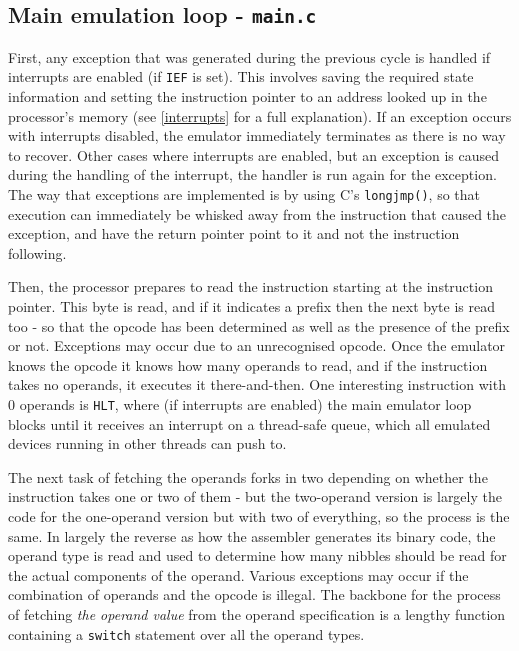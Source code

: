 \documentclass[12pt,a4paper]{report}
\begin{document}
\subsection*{Main emulation loop - \texttt{main.c}}

First, any exception that was generated during the previous cycle is handled if interrupts are enabled (if \texttt{IEF} is set). This involves saving the required state information and setting the instruction pointer to an address looked up in the processor's memory (see \autoref{interrupts} for a full explanation). If an exception occurs with interrupts disabled, the emulator immediately terminates as there is no way to recover. Other cases where interrupts are enabled, but an exception is caused during the handling of the interrupt, the handler is run again for the exception. The way that exceptions are implemented is by using C's \texttt{longjmp()}, so that execution can immediately be whisked away from the instruction that caused the exception, and have the return pointer point to it and not the instruction following.

Then, the processor prepares to read the instruction starting at the instruction pointer. This byte is read, and if it indicates a prefix then the next byte is read too - so that the opcode has been determined as well as the presence of the prefix or not. Exceptions may occur due to an unrecognised opcode. Once the emulator knows the opcode it knows how many operands to read, and if the instruction takes no operands, it executes it there-and-then. One interesting instruction with 0 operands is \texttt{HLT}, where (if interrupts are enabled) the main emulator loop blocks until it receives an interrupt on a thread-safe queue, which all emulated devices running in other threads can push to.

The next task of fetching the operands forks in two depending on whether the instruction takes one or two of them - but the two-operand version is largely the code for the one-operand version but with two of everything, so the process is the same. In largely the reverse as how the assembler generates its binary code, the operand type is read and used to determine how many nibbles should be read for the actual components of the operand. Various exceptions may occur if the combination of operands and the opcode is illegal. The backbone for the process of fetching \emph{the operand value} from the operand specification is a lengthy function containing a \texttt{switch} statement over all the operand types.
\end{document}
